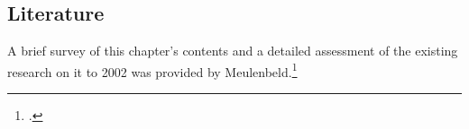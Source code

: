 
\subsection{Literature}

A brief survey of this chapter's contents and
a detailed assessment of the existing research on it to 2002 was
provided by Meulenbeld.\footcite[IA, 296--299]{meul-hist} 


